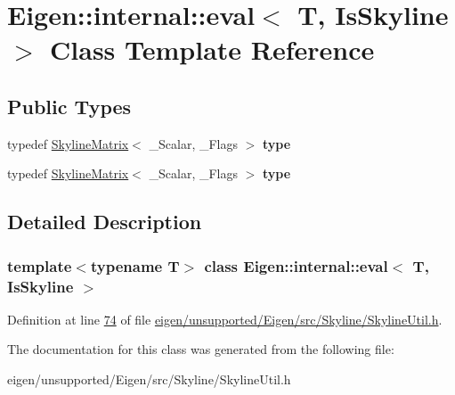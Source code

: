 \hypertarget{class_eigen_1_1internal_1_1eval_3_01_t_00_01_is_skyline_01_4}{}\section{Eigen\+:\+:internal\+:\+:eval$<$ T, Is\+Skyline $>$ Class Template Reference}
\label{class_eigen_1_1internal_1_1eval_3_01_t_00_01_is_skyline_01_4}
\subsection*{Public Types}
\begin{DoxyCompactItemize}
\item 
\mbox{\label{class_eigen_1_1internal_1_1eval_3_01_t_00_01_is_skyline_01_4_a0025b6ca6fe449bd2b0a2e85a2c30369}} 
typedef \hyperlink{class_eigen_1_1_skyline_matrix}{Skyline\+Matrix}$<$ \+\_\+\+Scalar, \+\_\+\+Flags $>$ {\bfseries type}
\item 
\mbox{\label{class_eigen_1_1internal_1_1eval_3_01_t_00_01_is_skyline_01_4_a0025b6ca6fe449bd2b0a2e85a2c30369}} 
typedef \hyperlink{class_eigen_1_1_skyline_matrix}{Skyline\+Matrix}$<$ \+\_\+\+Scalar, \+\_\+\+Flags $>$ {\bfseries type}
\end{DoxyCompactItemize}


\subsection{Detailed Description}
\subsubsection*{template$<$typename T$>$\newline
class Eigen\+::internal\+::eval$<$ T, Is\+Skyline $>$}



Definition at line \hyperlink{eigen_2unsupported_2_eigen_2src_2_skyline_2_skyline_util_8h_source_l00074}{74} of file \hyperlink{eigen_2unsupported_2_eigen_2src_2_skyline_2_skyline_util_8h_source}{eigen/unsupported/\+Eigen/src/\+Skyline/\+Skyline\+Util.\+h}.



The documentation for this class was generated from the following file\+:\begin{DoxyCompactItemize}
\item 
eigen/unsupported/\+Eigen/src/\+Skyline/\+Skyline\+Util.\+h\end{DoxyCompactItemize}
